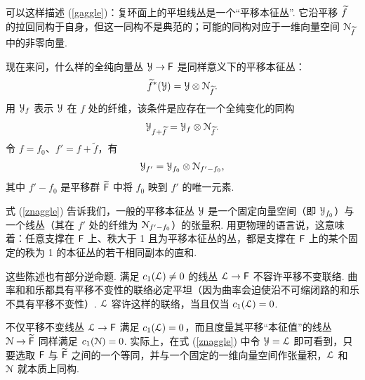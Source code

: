 可以这样描述 (\ref{gaggle})：复环面上的平坦线丛是一个“平移本征丛”.
它沿平移 $\t f$ 的拉回同构于自身，但这一同构不是典范的；可能的同构对应于一维向量空间 $ {\cal N}_{\t f}$ 中的非零向量.

现在来问，什么样的全纯向量丛 $ {\cal Y}\to \cF$ 是同样意义下的平移本征丛：
\begin{equation}\label{aggle} \tilde f^*({\cal Y})={\cal Y}\otimes
{\cal N}_{\tilde f}.\end{equation}
用 $ {\cal Y}_f$ 表示 $ {\cal Y}$ 在 $f$ 处的纤维，该条件是应存在一个全纯变化的同构
\begin{equation}\label{naggle}
{\cal Y}_{f+\tilde f}={\cal Y}_{f}\otimes {\cal N}_{\tilde f}.
\end{equation}
令 $f=f_0$、$f'=f+\tilde f$，有
\begin{equation}\label{znaggle}
{\cal Y}_{f'}={\cal Y}_{f_0}\otimes {\cal N}_{f'-f_0},
\end{equation}
其中 $f'-f_0$ 是平移群 $\tilde \cF$ 中将 $f_0$ 映到 $f'$ 的唯一元素.

式 (\ref{znaggle}) 告诉我们，一般的平移本征丛 $ {\cal Y}$ 是一个固定向量空间（即 $ {\cal Y}_{f_0}$）与一个线丛（其在 $f'$ 处的纤维为 $ {\cal N}_{f'-f_0}$）的张量积.
用更物理的语言说，这意味着：任意支撑在 $\cF$ 上、秩大于 1 且为平移本征丛的丛，都是支撑在 $\cF$ 上的某个固定的秩为 1 的本征丛的若干相同副本的直和.

这些陈述也有部分逆命题.
满足 $c_1({\cal L})\not= 0$ 的线丛 $ {\cal L}\to \cF$ 不容许平移不变联络.
曲率和和乐都具有平移不变性的联络必定平坦（因为曲率会迫使沿不可缩闭路的和乐不具有平移不变性）.
$ {\cal L}$ 容许这样的联络，当且仅当 $c_1({\cal L})=0$.

不仅平移不变线丛 $ {\cal L}\to \cF$ 满足 $c_1({\cal L})=0$，而且度量其平移“本征值”的线丛 $ {\cal N}\to \tilde \cF$ 同样满足 $c_1({\cal N})=0$.
实际上，在式 (\ref{znaggle}) 中令 $ {\cal Y}={\cal
L}$ 即可看到，只要选取 $\cF$ 与 $\tilde \cF$ 之间的一个等同，并与一个固定的一维向量空间作张量积，$ {\cal L}$ 和 $ {\cal N}$ 就本质上同构.

